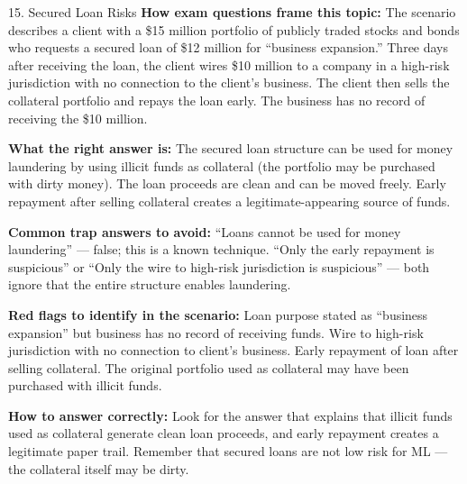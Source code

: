\documentclass[11pt,a4paper]{beamer}
\begin{document}
	\begin{frame}{15. Secured Loan Risks}
		\tiny
		\noindent\textbf{How exam questions frame this topic:} The scenario describes a client with a \$15 million portfolio of publicly traded stocks and bonds who requests a secured loan of \$12 million for “business expansion.” Three days after receiving the loan, the client wires \$10 million to a company in a high-risk jurisdiction with no connection to the client's business. The client then sells the collateral portfolio and repays the loan early. The business has no record of receiving the \$10 million.
		
		\vspace{0.1cm}
		\noindent\textbf{What the right answer is:} The secured loan structure can be used for money laundering by using illicit funds as collateral (the portfolio may be purchased with dirty money). The loan proceeds are clean and can be moved freely. Early repayment after selling collateral creates a legitimate-appearing source of funds.
		
		\vspace{0.1cm}
		\noindent\textbf{Common trap answers to avoid:} “Loans cannot be used for money laundering” — false; this is a known technique. “Only the early repayment is suspicious” or “Only the wire to high-risk jurisdiction is suspicious” — both ignore that the entire structure enables laundering.
		
		\vspace{0.1cm}
		\noindent\textbf{Red flags to identify in the scenario:} Loan purpose stated as “business expansion” but business has no record of receiving funds. Wire to high-risk jurisdiction with no connection to client's business. Early repayment of loan after selling collateral. The original portfolio used as collateral may have been purchased with illicit funds.
		
		\vspace{0.1cm}
		\noindent\textbf{How to answer correctly:} Look for the answer that explains that illicit funds used as collateral generate clean loan proceeds, and early repayment creates a legitimate paper trail. Remember that secured loans are not low risk for ML — the collateral itself may be dirty.
	\end{frame}
	
\end{document}
